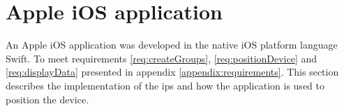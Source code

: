 \section{Apple iOS application}\label{sec:implApp}
An Apple iOS application was developed in the native iOS platform language Swift.
To meet requirements \ref{req:createGroups}, \ref{req:positionDevice} and \ref{req:displayData} presented in appendix \ref{appendix:requirements}.
This section describes the implementation of the \acrshort{ips} and how the application is used to position the device.



% 


